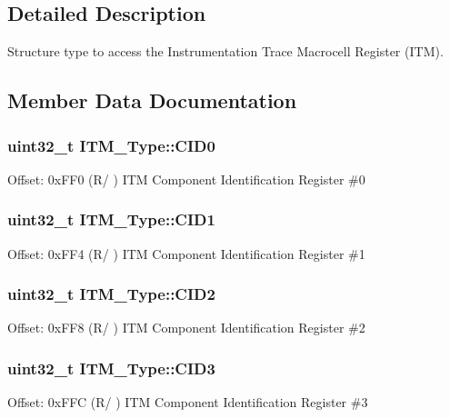 \subsection{Detailed Description}
Structure type to access the Instrumentation Trace Macrocell Register (I\+TM). 

\subsection{Member Data Documentation}
\subsubsection[{\texorpdfstring{C\+I\+D0}{CID0}}]{ uint32\+\_\+t I\+T\+M\+\_\+\+Type\+::\+C\+I\+D0}\hypertarget{structITM__Type_a413f3bb0a15222e5f38fca4baeef14f6}{}\label{structITM__Type_a413f3bb0a15222e5f38fca4baeef14f6}
Offset\+: 0x\+F\+F0 (R/ ) I\+TM Component Identification Register \#0 
\subsubsection[{\texorpdfstring{C\+I\+D1}{CID1}}]{ uint32\+\_\+t I\+T\+M\+\_\+\+Type\+::\+C\+I\+D1}\hypertarget{structITM__Type_a5f7d524b71f49e444ff0d1d52b3c3565}{}\label{structITM__Type_a5f7d524b71f49e444ff0d1d52b3c3565}
Offset\+: 0x\+F\+F4 (R/ ) I\+TM Component Identification Register \#1 
\subsubsection[{\texorpdfstring{C\+I\+D2}{CID2}}]{ uint32\+\_\+t I\+T\+M\+\_\+\+Type\+::\+C\+I\+D2}\hypertarget{structITM__Type_adee4ccce1429db8b5db3809c4539f876}{}\label{structITM__Type_adee4ccce1429db8b5db3809c4539f876}
Offset\+: 0x\+F\+F8 (R/ ) I\+TM Component Identification Register \#2 
\subsubsection[{\texorpdfstring{C\+I\+D3}{CID3}}]{ uint32\+\_\+t I\+T\+M\+\_\+\+Type\+::\+C\+I\+D3}\hypertarget{structITM__Type_a0e7aa199619cc7ac6baddff9600aa52e}{}\label{structITM__Type_a0e7aa199619cc7ac6baddff9600aa52e}
Offset\+: 0x\+F\+FC (R/ ) I\+TM Component Identification Register \#3 
